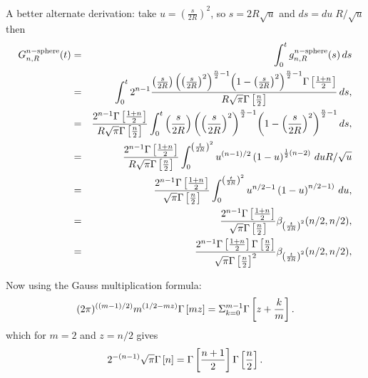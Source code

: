      
A better alternate derivation: take $u={\left(\frac{s}{2R}\right)}^2$, so $s = 2R \sqrt{u}$ and $ds = du\; R / \sqrt{u}$ then
\begin{eqnarray}
G^{n-{\rm sphere}}_{n,R}(t)
    & = & \int_0^t g^{n-{\rm sphere}}_{n,R}(s) \, ds \nonumber \\
    & = & \int_0^t  2^{n-1} \frac{\left( \frac{s}{2R}\right) {\left({\left( \frac{s}{2R}\right)}^{2}\right)}^{\frac{n}{2} -1}
             {\left(1 - {\left( \frac{s}{2R}\right)}^{2}  \right)}^{\frac{n}{2} -1}
             \Gamma\left[\frac{1+n}{2}\right]}{R\sqrt{\pi }
             \Gamma\left[\frac{n}{2}\right]} 
             \, ds, \nonumber \\    
    & = & \frac{ 2^{n- 1} \Gamma\left[\frac{1+n}{2}\right]}{R\sqrt{\pi}\Gamma\left[\frac{n}{2}\right]}
           \int_0^t \left( \frac{s}{2R}\right) {\left({\left( \frac{s}{2R}\right)}^{2}\right)}^{\frac{n}{2} -1}
             {\left(1 - {\left( \frac{s}{2R}\right)}^{2}  \right)}^{\frac{n}{2} -1}
             \, ds, \nonumber \\    
    & = & \frac{ 2^{n-1} \Gamma\left[\frac{1+n}{2}\right]}{R\sqrt{\pi}\Gamma\left[\frac{n}{2}\right]}
           \int_0^{ {\left(\frac{t}{2R}\right)}^{2} } u^{(n-1)/2}  \left(1 - u\right)^{\frac{1}{2} (n-2)}
             \, du R / \sqrt{u}  \nonumber \\    
    & = & \frac{ 2^{n-1} \Gamma\left[\frac{1+n}{2}\right]}{\sqrt{\pi}\Gamma\left[\frac{n}{2}\right]}
           \int_0^{{\left(\frac{t}{2R}\right)}^{2}} u^{n/2-1}  \left(1 - u\right)^{n/2-1)}
             \, du,  \nonumber \\    
    & = & \frac{ 2^{n-1} \Gamma\left[\frac{1+n}{2}\right]}{\sqrt{\pi}\Gamma\left[\frac{n}{2}\right]}
               \beta_{{\left(\frac{t}{2R}\right)}^{2}}(n/2, n/2),  \nonumber \\    
    & = & \frac{ 2^{n-1} \Gamma\left[\frac{1+n}{2}\right] \Gamma\left[\frac{n}{2}\right] }{\sqrt{\pi}\Gamma\left[\frac{n}{2}\right]^2}
               \beta_{{\left(\frac{t}{2R}\right)}^{2}}(n/2, n/2),  \nonumber \\ 
\end{eqnarray}


Now using the Gauss multiplication formula: 
\begin{equation}
(2\pi)^{((m-1)/2)}m^{(1/2-mz)} \Gamma\left[mz\right]=\Sigma_{k=0}^{m-1}\Gamma\left[z+\frac{k}{m}\right].  \nonumber \\ 
\end{equation}
which for $m = 2$ and $z = n/2$ gives
\begin{equation}
 2^{-(n-1)}\sqrt{ \pi } \Gamma\left[n\right]=\Gamma\left[\frac{n+1}{2}\right] \Gamma\left[\frac{n}{2}\right].   \nonumber \\ 
\end{equation}

